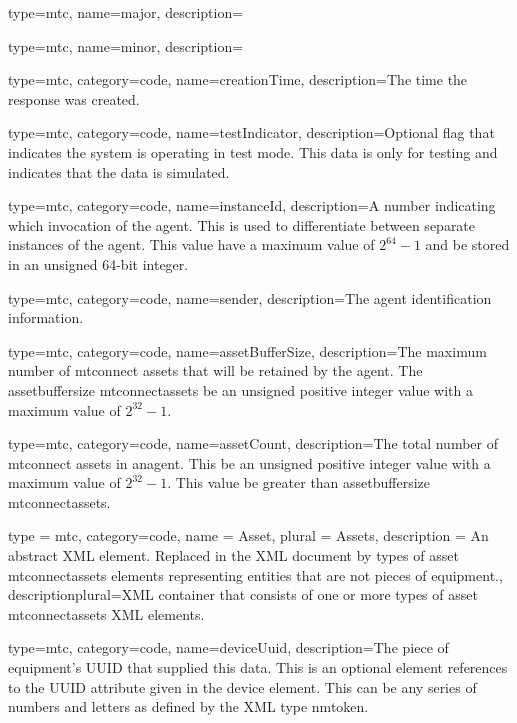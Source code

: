 {
  type=mtc,
  name={major},
  description={}
}


{
  type=mtc,
  name={minor},
  description={}
}

{
  type=mtc,
  category=code,
  name={creationTime},
  description={The time the response was created. }
}

{
  type=mtc,
  category=code,
  name={testIndicator},
  description={Optional flag that indicates the system is operating in test mode. This data is only for testing and indicates that the data is simulated. }
}

{
  type=mtc,
  category=code,
  name={instanceId},
  description={A number indicating which invocation of the \gls{agent}. This is used to differentiate between separate instances of the \gls{agent}. This value \MUST have a maximum value of $2^{64}-1$ and \MUST be stored in an unsigned 64-bit integer. }
}

{
  type=mtc,
  category=code,
  name={sender},
  description={The \gls{agent} identification information. }
}

{
  type=mtc,
  category=code,
  name={assetBufferSize},
  description={The maximum number of \glspl{mtconnect asset} that will be retained by the \gls{agent}. The \gls{assetbuffersize mtconnectassets} \MUST be an unsigned positive integer value with a maximum value of $2^{32}-1$. }
}

{
  type=mtc,
  category=code,
  name={assetCount},
  description={The total number of \glspl{mtconnect asset} in an\gls{agent}. This \MUST be an unsigned positive integer value with a maximum value of $2^{32}-1$. This value \MUSTNOT be greater than \gls{assetbuffersize mtconnectassets}.}
}


{
  type = mtc,
  category=code,
  name = {Asset},
  plural = {Assets},
  description = {An abstract XML element. Replaced in the XML document by types of \gls{asset mtconnectassets} elements representing entities that are not pieces of equipment.},
  descriptionplural={XML container that consists of one or more types of \gls{asset mtconnectassets} XML elements. }
}


{
  type=mtc,
  category=code,
  name={deviceUuid},
  description={The piece of equipment’s UUID that supplied this data. This is an optional element references to the UUID attribute given in the \gls{device} element. This can be any series of numbers and letters as defined by the XML type \gls{nmtoken}.
}
}

